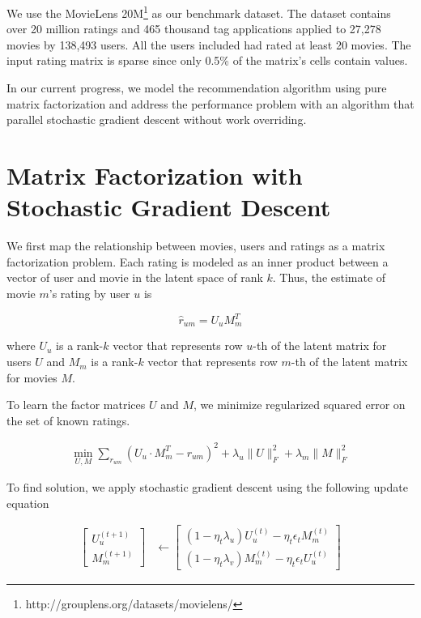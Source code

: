 \documentclass{article} %
\newcommand{\U}{U}
\newcommand{\M}{M}
\begin{document}
We use the MovieLens 20M\footnote{http://grouplens.org/datasets/movielens/}
as our benchmark dataset.  The dataset contains over 20 million ratings and 465 thousand tag applications applied to 27,278 movies by 138,493 users.
All the users included had rated at least 20 movies.  The input rating matrix is sparse since only 0.5\% of the matrix's cells contain values.

In our current progress,  we model the recommendation algorithm using pure matrix
factorization and address the performance problem with an algorithm that parallel stochastic gradient descent without work overriding.




\section{Matrix Factorization with Stochastic Gradient Descent}

We first map the relationship between movies, users and ratings
as a matrix factorization problem.
Each rating is modeled as an inner product between a vector of user and movie in the latent space of rank $k$.  Thus, the estimate of movie $m$'s rating by user $u$ is

\[
  \hat{r}_{um} = \U_u \M_m^T
\]

where $\U_u$ is a rank-$k$ vector that represents row $u$-th of the latent matrix for users $\U$ and $\M_m$ is a rank-$k$ vector that represents row $m$-th of the latent matrix for movies $\M$.

To learn the factor matrices $\U$ and $\M$, we minimize regularized squared error on the set of known ratings.

\begin{align}
  \min_{\U,\M} \sum_{r_{um}} (\U_u \cdot \M_m^T - r_{um})^2
  + \lambda_u \|\U\|^2_F + \lambda_m \|\M\|^2_F
\end{align}

To find solution, we apply stochastic gradient descent using the following update equation

\begin{align}
\left[\begin{array}{c}
\U_u^{(t+1)}
\\
\M_m^{(t+1)}
\end{array}\right]
& \leftarrow
\left[\begin{array}{c}
(1-\eta_t \lambda_u) \U_u^{(t)} - \eta_t \epsilon_t \M_m^{(t)}
\\
(1-\eta_t \lambda_v) \M_m^{(t)} - \eta_t \epsilon_t \U_u^{(t)}
\end{array}\right]
\label{eq:update}
\end{align}
\end{document}
